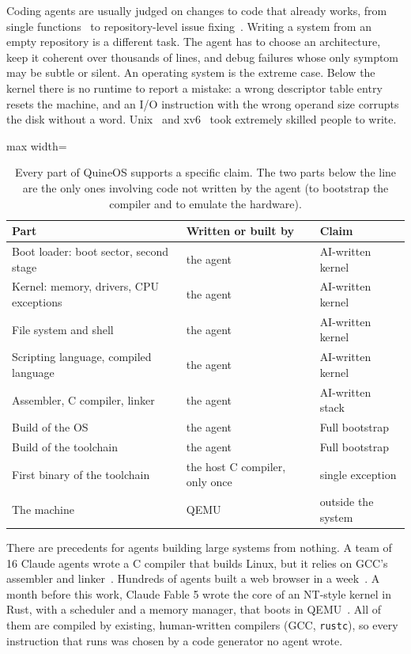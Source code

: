 \documentclass{article}
\newcommand{\sysname}{QuineOS}
\begin{document}
Coding agents are usually judged on changes to code that already works, from single
functions~\cite{chen2021codex} to repository-level issue fixing~\cite{jimenez2024swebench}.
Writing a system from an empty repository is a different task. The agent has to choose
an architecture, keep it coherent over thousands of lines, and debug failures whose only
symptom may be subtle or silent. An operating system is the extreme case.
Below the kernel there is no runtime to report a mistake: a wrong descriptor table entry
resets the machine, and an I/O instruction with the wrong operand size corrupts the disk
without a word. Unix~\cite{ritchie1974unix} and xv6~\cite{cox2006xv6} took extremely skilled people to write.

\begin{table}[t]
\centering
\caption{Every part of \sysname{} supports a specific claim. The two parts below the line are the only ones involving code not written by the agent (to bootstrap the compiler and to emulate the hardware).}
\label{tab:goal}
\begin{adjustbox}{max width=\linewidth}
\begin{tabular}{lll}
\toprule
Part & Written or built by & Claim \\
\midrule
Boot loader: boot sector, second stage & the agent & AI-written kernel \\
Kernel: memory, drivers, CPU exceptions & the agent & AI-written kernel \\
File system and shell & the agent & AI-written kernel \\
Scripting language, compiled language & the agent & AI-written kernel \\
Assembler, C compiler, linker & the agent & AI-written stack \\
Build of the OS & the agent & Full bootstrap \\
Build of the toolchain & the agent  & Full bootstrap \\
\midrule
First binary of the toolchain & the host C compiler, only once & single exception \\
The machine & QEMU & outside the system \\
\bottomrule
\end{tabular}
\end{adjustbox}
\end{table}

There are precedents for agents building large systems from nothing. A team of 16 Claude
agents wrote a C compiler that builds Linux, but it relies on GCC's assembler and
linker~\cite{carlini2026ccc}. Hundreds of agents built a web browser in a
week~\cite{lin2026scaling}. A month before this work, Claude Fable 5 wrote the core of an
NT-style kernel in Rust, with a scheduler and a memory manager, that boots in
QEMU~\cite{suiche2026ntoskrnl}. All of them are compiled by existing, human-written
compilers (GCC, \texttt{rustc}), so every instruction that runs was chosen by a code
generator no agent wrote.
\end{document}
